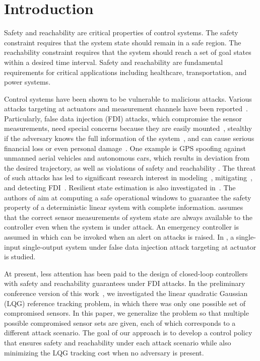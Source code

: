 \documentclass[journal]{IEEEtran}
\begin{document}
\section{Introduction}
Safety \cite{mitra2013verifying,banerjee2011ensuring} and reachability \cite{kwon2017reachability} are critical properties of control systems. The safety constraint requires that the system state should remain in a safe region. The reachability constraint requires that the system should reach a set of goal states within a desired time interval. Safety and reachability are fundamental requirements for critical applications including healthcare, transportation, and power systems.

Control systems have been shown to be vulnerable to malicious attacks. Various attacks targeting at actuators and measurement channels have been reported~\cite{liu2011false,teixeira2012attack}. Particularly, false data injection (FDI) attacks, which compromise the sensor measurements, need special concerns because they are easily mounted~\cite{liang20162015}, stealthy if the adversary knows the full information of the system~\cite{yu2015blind,mo2010false}, and can cause serious financial loss or even personal damage~\cite{liang2016review}.  
One example is GPS spoofing against unmanned aerial vehicles and autonomous cars, which results in deviation from the desired trajectory, as well as violations of safety and reachability \cite{kerns2014unmanned,petit2014potential}. The threat of such attacks has led to significant research interest in modeling~\cite{zhang2017game,hu2018state,zhang2020false}, mitigating~\cite{wu2018detecting}, and detecting FDI~\cite{mo2010false}\cite{liu2014detecting}. Resilient state estimation is also investigated in~\cite{shoukry2018smt,pajic2016attack,fawzi2014secure}. The authors of \cite{abdi2018preserving} aim at computing a safe operational windows to guarantee the safety property of a deterministic linear system with complete information. \cite{wu2018detecting} assumes that the correct sensor measurements of system state are always available to the controller even when the system is under attack. An emergency controller is assumed in \cite{gheitasi2019novel} which can be invoked when an alert on attacks is raised. In \cite{farivar2019artificial}, a single-input single-output system under false data injection attack targeting at actuator is studied.

At present, less attention has been paid to the design of closed-loop controllers with safety and reachability guarantees under FDI attacks. In the preliminary conference version of this work~\cite{niu2019lqg}, we investigated the linear quadratic Gaussian (LQG) reference tracking problem, in which there was only one possible set of compromised sensors. In this paper, we generalize the problem so that multiple possible compromised sensor sets are given, each of which corresponds to a different attack scenario. The goal of our approach is to develop a control policy that ensures safety and reachability under each attack scenario while also minimizing the LQG tracking cost when no adversary is present.  
\end{document}
